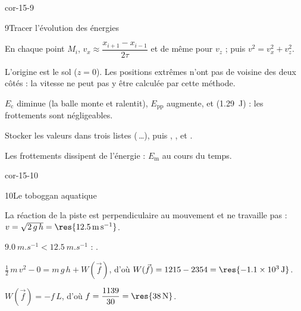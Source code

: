 \begin{blocLivre}{cor-15-9}
\begin{corrige}{9}{Tracer l'évolution des énergies}
\begin{questions}
\item En chaque point $M_i$, $v_x\approx\dfrac{x_{i+1}-x_{i-1}}{2\tau}$ et de même pour $v_z$ ; puis $v^2=v_x^2+v_z^2$.
\item L'origine est le sol ($z=0$). Les positions extrêmes n'ont pas de voisine des deux côtés : la vitesse ne peut pas y
être calculée par cette méthode.
\item $E_\mathrm{c}$ diminue (la balle monte et ralentit), $E_\mathrm{pp}$ augmente, et 
(\qty{1,29}{J}) : les frottements sont négligeables.
\item Stocker les valeurs dans trois listes (\,\dots), puis
, ,  et .
\item Les frottements dissipent de l'énergie : $E_\mathrm{m}$  au cours du temps.
\end{questions}
\end{corrige}
\end{blocLivre}
\begin{blocLivre}{cor-15-10}
\begin{corrige}{10}{Le toboggan aquatique}
\begin{questions}
\item La réaction de la piste est perpendiculaire au mouvement et ne travaille pas : $v=\sqrt{2\,g\,h}=\res{\qty{12,5}{m.s^{-1}}}$.
\item $\qty{9,0}{m.s^{-1}}<\qty{12,5}{m.s^{-1}}$ : .
\item $\frac12\,m\,v^2-0=m\,g\,h+W(\vec{f})$, d'où $W(\vec{f})=1215-2354=\res{\qty{-1,1e3}{J}}$.
\item $W(\vec{f})=-f\,L$, d'où $f=\dfrac{1139}{30}=\res{\qty{38}{N}}$.
\end{questions}
\end{corrige}
\end{blocLivre}
